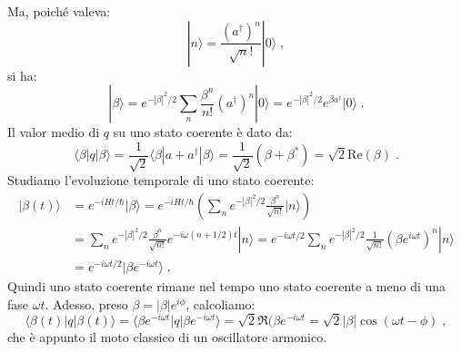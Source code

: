 \documentclass[10pt,a4paper]{report}
\theoremstyle{definition}
\numberwithin{equation}{section}
\newcommand{\bra}{\langle}
\newcommand{\ket}{\rangle}
\newcommand{\adj}[1]{#1^{\dagger}}
\begin{document}
Ma, poiché valeva:
$$
|n\ket=\frac{(\adj{a})^n}{\sqrt{n}!}|0\ket\;,
$$
si ha:
\begin{equation}
|\beta\ket=e^{-|\beta|^2/2}\sum_n \frac{\beta^n}{n!}(\adj{a})^n|0\ket=e^{-|\beta|^2/2}e^{\beta\adj{a}}|0\ket\;. \label{ch4_staticoerenti}
\end{equation}
Il valor medio di $q$ su uno stato coerente è dato da:
\begin{equation}
\bra\beta|q|\beta\ket=\frac{1}{\sqrt{2}}\bra\beta|a+\adj{a}|\beta\ket=\frac{1}{\sqrt{2}}(\beta+\beta^*)=\sqrt{2}\mathrm{Re}(\beta)\;.
\end{equation}
Studiamo l'evoluzione temporale di uno stato coerente:
\begin{align*}
|\beta(t)\ket &= e^{-iHt/\hbar}|\beta\ket=e^{-iHt/\hbar}\left(\sum_n e^{-|\beta|^2/2}\frac{\beta^n}{\sqrt{n!}}|n\ket\right) \\
&= \sum_n e^{-|\beta|^2/2}\frac{\beta^n}{\sqrt{n!}}e^{-i\omega(n+1/2)t}|n\ket= e^{-i\omega t/2}\sum_n e^{-|\beta|^2/2}\frac{1}{\sqrt{n!}}(\beta e^{i\omega t})^n|n\ket \\
&= e^{-i\omega t/2}|\beta e^{-i\omega t}\ket\;.
\end{align*}
Quindi uno stato coerente rimane nel tempo uno stato coerente a meno di una fase $\omega t$. Adesso, preso $\beta=|\beta|e^{i\phi}$, calcoliamo:
$$
\bra \beta(t)|q|\beta(t)\ket=\bra\beta e^{-i\omega t}|q|\beta e^{-i\omega t}\ket=\sqrt{2}\Re(\beta e^{-i\omega t}=\sqrt{2}|\beta|\cos(\omega t-\phi)\;,
$$
che è appunto il moto classico di un oscillatore armonico.
\end{document}

